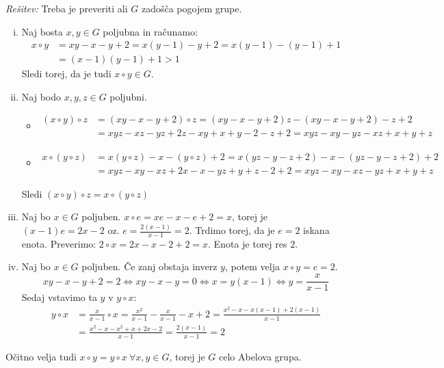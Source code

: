 \documentclass[a4paper, 10pt]{article}
\newenvironment{resitev}{\begin{flushleft}\textit{Rešitev:}}{\hfill\end{flushleft}}
\begin{document}
	\begin{resitev}
		Treba je preveriti ali $G$ zadošča pogojem grupe.
		\begin{enumerate}[i)]
			\item Naj bosta $x, y \in G$ poljubna in računamo: \begin{align*}
				x\circ y &= xy - x - y + 2 = x(y-1) - y + 2 = x(y-1) - (y - 1) + 1 \\
				&= (x-1)(y-1) + 1 > 1
			\end{align*}
			Sledi torej, da je tudi $x\circ y \in G$.
			\item Naj bodo $x, y, z\in G$ poljubni. \begin{itemize}
				\item \begin{align*}
				(x\circ y)\circ z &= (xy - x - y + 2) \circ z = (xy - x - y + 2)z - (xy - x - y + 2) - z + 2 \\
				&= xyz - xz - yz + 2z - xy + x + y - 2 - z + 2 = xyz - xy - yz - xz + x + y + z
			\end{align*}
			\item \begin{align*}
				x\circ (y\circ z) &= x(y\circ z) - x - (y\circ z) + 2 = x(yz - y - z + 2) - x - (yz - y - z + 2) + 2 \\
				&= xyz - xy - xz + 2x - x - yz + y +z - 2 + 2 = xyz - xy - xz - yz + x + y + z
			\end{align*}
		\end{itemize}
		Sledi $(x\circ y)\circ z = x\circ (y\circ z)$
		\item Naj bo $x\in G$ poljuben. $x\circ e = xe - x - e + 2 = x$, torej je $(x - 1)e = 2x - 2$ oz. $e = \frac{2(x-1)}{x-1} = 2$. Trdimo torej, da je $e = 2$ iskana enota. Preverimo: $2\circ x = 2x - x - 2 + 2 = x$. Enota je torej res $2$.
		\item Naj bo $x\in G$ poljuben. Če zanj obstaja inverz $y$, potem velja $x\circ y = e = 2$. $$xy - x - y +2 = 2 \iff xy - x - y = 0 \iff x = y(x-1) \iff y = \frac{x}{x-1}$$
		Sedaj vstavimo ta $y$ v $y\circ x$: \begin{align*} 
			y\circ x &= \frac{x}{x-1}\circ x = \frac{x^2}{x-1} - \frac{x}{x-1} - x + 2 = \frac{x^2 - x - x(x-1) + 2(x-1)}{x-1} \\
			&= \frac{x^2 - x - x^2 + x + 2x - 2}{x-1} = \frac{2(x-1)}{x-1} = 2
			\end{align*} 
		\end{enumerate}
		Očitno velja tudi $x\circ y = y\circ x~\forall x, y\in G$, torej je $G$ celo Abelova grupa.
	\end{resitev}
\end{document}

